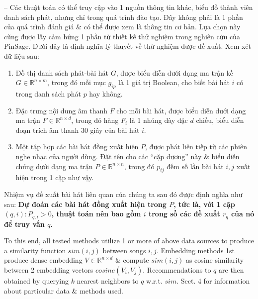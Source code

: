 \documentclass{article}
\begin{document}
\begin{itemize}
\begin{itemize}
        -- Các thuật toán có thể truy cập vào 1 nguồn thông tin khác, biểu đồ thành viên danh sách phát, nhưng chỉ trong quá trình đào tạo. Đây không phải là 1 phần của quá trình đánh giá \& có thể được xem là thông tin cơ bản. Lựa chọn này cũng được lấy cảm hứng 1 phần từ thiết kế thử nghiệm trong nghiên cứu của PinSage. Dưới đây là định nghĩa lý thuyết về thử nghiệm được đề xuất. Xem xét dữ liệu sau:
        \begin{enumerate}
            \item Đồ thị danh sách phát-bài hát $G$, được biểu diễn dưới dạng ma trận kề $G\in\mathbb{R}^{n\times m}$, trong đó mỗi mục $g_{ip}$ là 1 giá trị Boolean, cho biết bài hát $i$ có trong danh sách phát $p$ hay không.
            \item Đặc trưng nội dung âm thanh $F$ cho mỗi bài hát, được biểu diễn dưới dạng ma trận $F\in\mathbb{R}^{n\times d}$, trong đó hàng $F_i$ là 1 nhúng dày đặc $d$ chiều, biểu diễn đoạn trích âm thanh 30 giây của bài hát $i$.
            \item Một tập hợp các bài hát đồng xuất hiện $P$, được phát liên tiếp từ các phiên nghe nhạc của người dùng. Đặt tên cho các ``cặp dương'' này \& biểu diễn chúng dưới dạng ma trận $P\in\mathbb{R}^{n\times n}$, trong đó $p_{ij}$ đếm số lần bài hát $i,j$ xuất hiện trong 1 cặp như vậy.
        \end{enumerate}
        Nhiệm vụ đề xuất bài hát liên quan của chúng ta sau đó được định nghĩa như sau: {\bf Dự đoán các bài hát đồng xuất hiện trong $P$, tức là, với 1 cặp $(q,i):P_{q,i} > 0$, thuật toán nên bao gồm $i$ trong số các đề xuất $r_q$ của nó để truy vấn $q$.}

        To this end, all tested methods utilize 1 or more of above data sources to produce a similarity function $sim(i,j)$ between songs $i,j$. Embedding methods 1st produce dense embedding $V\in\mathbb{R}^{n\times d}$ \& compute $sim(i,j)$ as cosine similarity between 2 embedding vectors $cosine(V_i,V_j)$. Recommendations to $q$ are then obtained by querying $k$ nearest neighbors to $q$ w.r.t. $sim$. Sect. 4 for information about particular data \& methods used.


\end{itemize}
\end{itemize}
\end{document}
